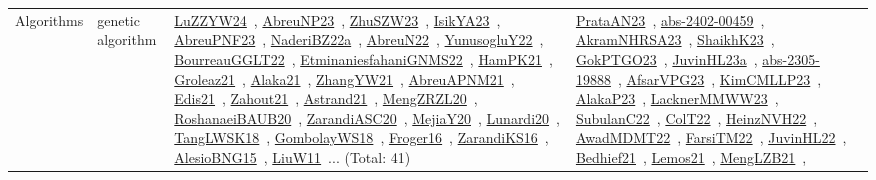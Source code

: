 {\begin{longtable}{lp{3cm}>{\raggedright\arraybackslash}p{6cm}>{\raggedright\arraybackslash}p{6cm}>{\raggedright\arraybackslash}p{8cm}}
\index{genetic algorithm}\index{Algorithms!genetic algorithm}Algorithms & genetic algorithm & \href{../works/LuZZYW24.pdf}{LuZZYW24}~\cite{LuZZYW24}, \href{../works/AbreuNP23.pdf}{AbreuNP23}~\cite{AbreuNP23}, \href{../works/ZhuSZW23.pdf}{ZhuSZW23}~\cite{ZhuSZW23}, \href{../works/IsikYA23.pdf}{IsikYA23}~\cite{IsikYA23}, \href{../works/AbreuPNF23.pdf}{AbreuPNF23}~\cite{AbreuPNF23}, \href{../works/NaderiBZ22a.pdf}{NaderiBZ22a}~\cite{NaderiBZ22a}, \href{../works/AbreuN22.pdf}{AbreuN22}~\cite{AbreuN22}, \href{../works/YunusogluY22.pdf}{YunusogluY22}~\cite{YunusogluY22}, \href{../works/BourreauGGLT22.pdf}{BourreauGGLT22}~\cite{BourreauGGLT22}, \href{../works/EtminaniesfahaniGNMS22.pdf}{EtminaniesfahaniGNMS22}~\cite{EtminaniesfahaniGNMS22}, \href{../works/HamPK21.pdf}{HamPK21}~\cite{HamPK21}, \href{../works/Groleaz21.pdf}{Groleaz21}~\cite{Groleaz21}, \href{../works/Alaka21.pdf}{Alaka21}~\cite{Alaka21}, \href{../works/ZhangYW21.pdf}{ZhangYW21}~\cite{ZhangYW21}, \href{../works/AbreuAPNM21.pdf}{AbreuAPNM21}~\cite{AbreuAPNM21}, \href{../works/Edis21.pdf}{Edis21}~\cite{Edis21}, \href{../works/Zahout21.pdf}{Zahout21}~\cite{Zahout21}, \href{../works/Astrand21.pdf}{Astrand21}~\cite{Astrand21}, \href{../works/MengZRZL20.pdf}{MengZRZL20}~\cite{MengZRZL20}, \href{../works/RoshanaeiBAUB20.pdf}{RoshanaeiBAUB20}~\cite{RoshanaeiBAUB20}, \href{../works/ZarandiASC20.pdf}{ZarandiASC20}~\cite{ZarandiASC20}, \href{../works/MejiaY20.pdf}{MejiaY20}~\cite{MejiaY20}, \href{../works/Lunardi20.pdf}{Lunardi20}~\cite{Lunardi20}, \href{../works/TangLWSK18.pdf}{TangLWSK18}~\cite{TangLWSK18}, \href{../works/GombolayWS18.pdf}{GombolayWS18}~\cite{GombolayWS18}, \href{../works/Froger16.pdf}{Froger16}~\cite{Froger16}, \href{../works/ZarandiKS16.pdf}{ZarandiKS16}~\cite{ZarandiKS16}, \href{../works/AlesioBNG15.pdf}{AlesioBNG15}~\cite{AlesioBNG15}, \href{../works/LiuW11.pdf}{LiuW11}~\cite{LiuW11}... (Total: 41) & \href{../works/PrataAN23.pdf}{PrataAN23}~\cite{PrataAN23}, \href{../works/abs-2402-00459.pdf}{abs-2402-00459}~\cite{abs-2402-00459}, \href{../works/AkramNHRSA23.pdf}{AkramNHRSA23}~\cite{AkramNHRSA23}, \href{../works/ShaikhK23.pdf}{ShaikhK23}~\cite{ShaikhK23}, \href{../works/GokPTGO23.pdf}{GokPTGO23}~\cite{GokPTGO23}, \href{../works/JuvinHL23a.pdf}{JuvinHL23a}~\cite{JuvinHL23a}, \href{../works/abs-2305-19888.pdf}{abs-2305-19888}~\cite{abs-2305-19888}, \href{../works/AfsarVPG23.pdf}{AfsarVPG23}~\cite{AfsarVPG23}, \href{../works/KimCMLLP23.pdf}{KimCMLLP23}~\cite{KimCMLLP23}, \href{../works/AlakaP23.pdf}{AlakaP23}~\cite{AlakaP23}, \href{../works/LacknerMMWW23.pdf}{LacknerMMWW23}~\cite{LacknerMMWW23}, \href{../works/SubulanC22.pdf}{SubulanC22}~\cite{SubulanC22}, \href{../works/ColT22.pdf}{ColT22}~\cite{ColT22}, \href{../works/HeinzNVH22.pdf}{HeinzNVH22}~\cite{HeinzNVH22}, \href{../works/AwadMDMT22.pdf}{AwadMDMT22}~\cite{AwadMDMT22}, \href{../works/FarsiTM22.pdf}{FarsiTM22}~\cite{FarsiTM22}, \href{../works/JuvinHL22.pdf}{JuvinHL22}~\cite{JuvinHL22}, \href{../works/Bedhief21.pdf}{Bedhief21}~\cite{Bedhief21}, \href{../works/Lemos21.pdf}{Lemos21}~\cite{Lemos21}, \href{../works/MengLZB21.pdf}{MengLZB21}~\cite{MengLZB21}, 
\end{longtable}}
